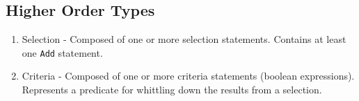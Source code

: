 \subsection{Higher Order Types}
\begin{enumerate}
\item Selection - Composed of one or more selection statements. Contains at least one \texttt{Add} statement.
\item Criteria - Composed of one or more criteria statements (boolean expressions). Represents a predicate for whittling down the results from a selection. 
\end{enumerate}